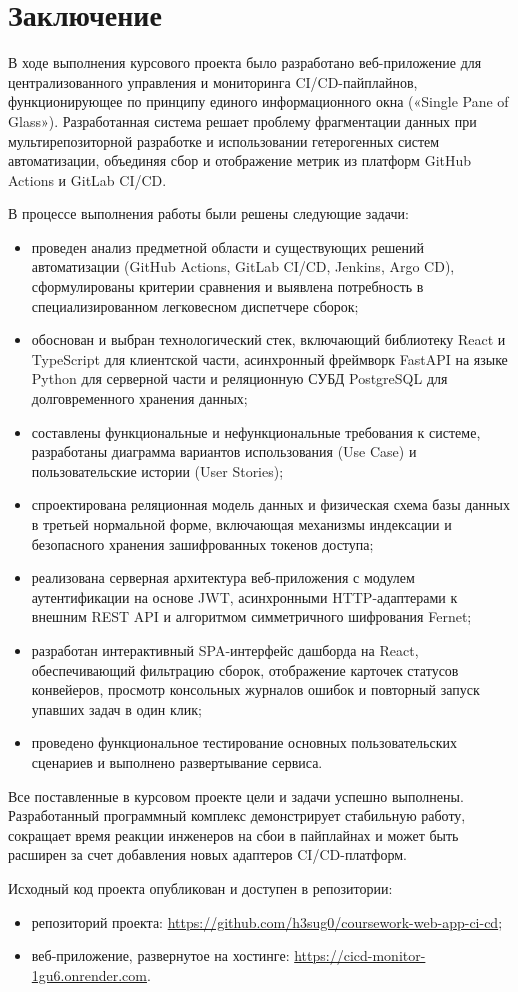 \section*{Заключение}

В ходе выполнения курсового проекта было разработано веб-приложение для централизованного управления и мониторинга CI/CD-пайплайнов, функционирующее по принципу единого информационного окна («Single Pane of Glass»). Разработанная система решает проблему фрагментации данных при мультирепозиторной разработке и использовании гетерогенных систем автоматизации, объединяя сбор и отображение метрик из платформ GitHub Actions и GitLab CI/CD.

В процессе выполнения работы были решены следующие задачи:
\begin{itemize}
    \item проведен анализ предметной области и существующих решений автоматизации (GitHub Actions, GitLab CI/CD, Jenkins, Argo CD), сформулированы критерии сравнения и выявлена потребность в специализированном легковесном диспетчере сборок;
    \item обоснован и выбран технологический стек, включающий библиотеку React и TypeScript для клиентской части, асинхронный фреймворк FastAPI на языке Python для серверной части и реляционную СУБД PostgreSQL для долговременного хранения данных;
    \item составлены функциональные и нефункциональные требования к системе, разработаны диаграмма вариантов использования (Use Case) и пользовательские истории (User Stories);
    \item спроектирована реляционная модель данных и физическая схема базы данных в третьей нормальной форме, включающая механизмы индексации и безопасного хранения зашифрованных токенов доступа;
    \item реализована серверная архитектура веб-приложения с модулем аутентификации на основе JWT, асинхронными HTTP-адаптерами к внешним REST API и алгоритмом симметричного шифрования Fernet;
    \item разработан интерактивный SPA-интерфейс дашборда на React, обеспечивающий фильтрацию сборок, отображение карточек статусов конвейеров, просмотр консольных журналов ошибок и повторный запуск упавших задач в один клик;
    \item проведено функциональное тестирование основных пользовательских сценариев и выполнено развертывание сервиса.
\end{itemize}

Все поставленные в курсовом проекте цели и задачи успешно выполнены. Разработанный программный комплекс демонстрирует стабильную работу, сокращает время реакции инженеров на сбои в пайплайнах и может быть расширен за счет добавления новых адаптеров CI/CD-платформ.

Исходный код проекта опубликован и доступен в репозитории:
\begin{itemize}
    \item репозиторий проекта: \url{https://github.com/h3sug0/coursework-web-app-ci-cd};
    \item веб-приложение, развернутое на хостинге: \url{https://cicd-monitor-1gu6.onrender.com}.
\end{itemize}